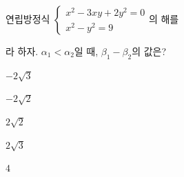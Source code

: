 연립방정식 $\begin{cases} x^2-3xy+2y^2=0 \\ x^2-y^2=9 \end{cases}$의 해를 \par\smallskip{}\par\smallskip\noindent 라 하자. $\alpha_1<\alpha_2$일 때, $\beta_1-\beta_2$의 값은?
\begin{choices32}{\rule[-3ex]{0pt}{8ex}$-2\sqrt{3}$}{\rule[-3ex]{0pt}{8ex}$-2\sqrt{2}$}{\rule[-3ex]{0pt}{8ex}$2\sqrt{2}$}{\rule[-3ex]{0pt}{8ex}$2\sqrt{3}$}{\rule[-3ex]{0pt}{8ex}$4$}\end{choices32}
